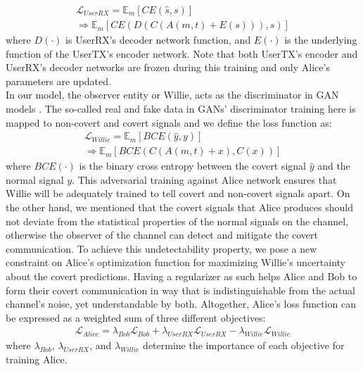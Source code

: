 \begin{equation}
	\begin{array}{l} \label{alice_user_loss}
	\mathcal{L}_{UserRX} = \mathbb{E}_{m}[CE(\hat{s}, s)] \\ \Rightarrow \mathbb{E}_{m}[CE(D(C(A(m, t) + E(s))), s)]
	\end{array}
\end{equation}
where \(D(\cdot)\) is UserRX's decoder network function, and \(E(\cdot)\) is the underlying function of the UserTX's encoder network. Note that both UserTX's encoder and UserRX's decoder networks are frozen during this training and only Alice's parameters are updated.\\
In our model, the observer entity or Willie, acts as the discriminator in GAN models \cite{goodfellow2014generative}. The so-called real and fake data in GANs' discriminator training here is mapped to non-covert and covert signals and we define the loss function as:
\begin{equation}
		\begin{array}{l} \label{willie_loss}
	\mathcal{L}_{Willie} = \mathbb{E}_{m}[BCE(\hat{y}, y)] \\ \Rightarrow \mathbb{E}_{m}[BCE(C(A(m,t) + x), C(x))]
	\end{array}
\end{equation}
where \(BCE(\cdot)\) is the binary cross entropy between the covert signal \(\hat{y}\) and the normal signal \(y\). This adversarial training against Alice network ensures that Willie will be adequately trained to tell covert and non-covert signals apart. On the other hand, we mentioned that the covert signals that Alice produces should not deviate from the statistical properties of the normal signals on the channel, otherwise the observer of the channel can detect and mitigate the covert communication. To achieve this undetectability property, we pose a new constraint on Alice's optimization function for maximizing Willie's uncertainty about the covert predictions. Having a regularizer as such helps Alice and Bob to form their covert communication in way that is indistinguishable from the actual channel's noise, yet understandable by both. Altogether, Alice's loss function can be expressed as a weighted sum of three different objectives:
\begin{equation}
	\begin{array}{l} \label{alice_loss}
	\mathcal{L}_{Alice} = \lambda_{Bob} \mathcal{L}_{Bob} + \lambda_{UserRX} \mathcal{L}_{UserRX} - \lambda_{Willie} \mathcal{L}_{Willie}
\end{array}
\end{equation}
where \(\lambda_{Bob}\), \(\lambda_{UserRX}\), and \(\lambda_{Willie}\) determine the importance of each objective for training Alice.

